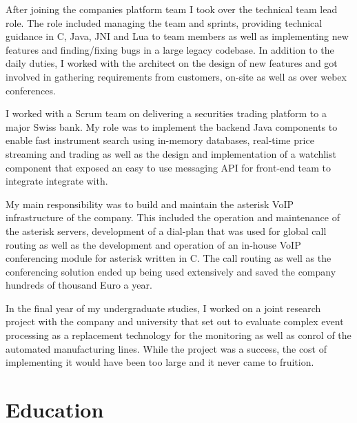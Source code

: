 \documentclass[11pt,a4paper]{my_cv}
\begin{document}
After joining the companies platform team I took over the technical team lead role. The role included managing the team and sprints, providing technical guidance in C, Java, JNI and Lua to team members as well as implementing new features and finding/fixing bugs in a large legacy codebase. In addition to the daily duties, I worked with the architect on the design of new features and got involved in gathering requirements from customers, on-site as well as over webex conferences.

I worked with a Scrum team on delivering a securities trading platform to a major Swiss bank. My role was to implement the backend Java components to enable fast instrument search using in-memory databases, real-time price streaming and trading as well as the design and implementation of a watchlist component that exposed an easy to use messaging API for front-end team to integrate integrate with.

My main responsibility was to build and maintain the asterisk VoIP infrastructure of the company. This included the operation and maintenance of the asterisk servers, development of a dial-plan that was used for global call routing as well as the development and operation of an in-house VoIP conferencing module for asterisk written in C. The call routing as well as the conferencing solution ended up being used extensively and saved the company hundreds of thousand Euro a year.

In the final year of my undergraduate studies, I worked on a joint research project with the company and university that set out to evaluate complex event processing as a replacement technology for the monitoring as well as conrol of the automated manufacturing lines. While the project was a success, the cost of implementing it would have been too large and it never came to fruition.

\section{Education}
\begin{projects}{10em}
\end{projects}
\begin{modules}
\end{modules}
\end{document}
